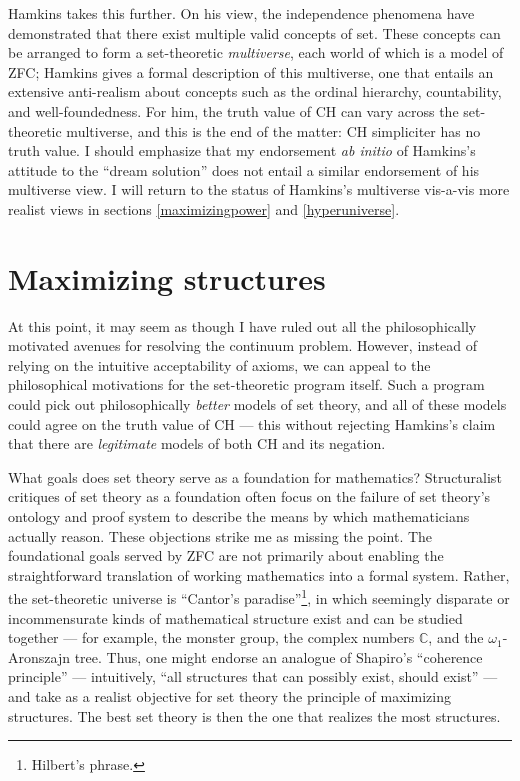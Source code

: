 \documentclass[letterpaper,12pt]{article}
\begin{document}
Hamkins takes this further. On his view, the independence phenomena have demonstrated that there exist multiple valid concepts of set. These concepts can be arranged to form a set-theoretic \emph{multiverse}, each world of which is a model of ZFC; Hamkins gives a formal description of this multiverse, one that entails an extensive anti-realism about concepts such as the ordinal hierarchy, countability, and well-foundedness. For him, the truth value of CH can vary across the set-theoretic multiverse, and this is the end of the matter: CH simpliciter has no truth value. I should emphasize that my endorsement \emph{ab initio} of Hamkins's attitude to the ``dream solution'' does not entail a similar endorsement of his multiverse view. I will return to the status of Hamkins's multiverse vis-a-vis more realist views in sections \ref{maximizingpower} and \ref{hyperuniverse}.

\section{Maximizing structures}
\label{maximizingstructures}
At this point, it may seem as though I have ruled out all the philosophically motivated avenues for resolving the continuum problem. However, instead of relying on the intuitive acceptability of axioms, we can appeal to the philosophical motivations for the set-theoretic program itself. Such a program could pick out philosophically \emph{better} models of set theory, and all of these models could agree on the truth value of CH --- this without rejecting Hamkins's claim that there are \emph{legitimate} models of both CH and its negation.

What goals does set theory serve as a foundation for mathematics? Structuralist critiques of set theory as a foundation often focus on the failure of set theory's ontology and proof system to describe the means by which mathematicians actually reason. These objections strike me as missing the point. The foundational goals served by ZFC are not primarily about enabling the straightforward translation of working mathematics into a formal system. Rather, the set-theoretic universe is ``Cantor's paradise''\footnote{Hilbert's phrase.}, in which seemingly disparate or incommensurate kinds of mathematical structure exist and can be studied together --- for example, the monster group, the complex numbers $\mathbb{C}$, and the $\omega_1$-Aronszajn tree. Thus, one might endorse an analogue of Shapiro's \citeyearpar{shapiro1997philosophy} ``coherence principle'' --- intuitively, ``all structures that can possibly exist, should exist'' --- and take as a realist objective for set theory the principle of maximizing structures. The best set theory is then the one that realizes the most structures.
\end{document}
